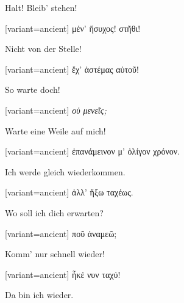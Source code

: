 Halt! Bleib' stehen!

\switchcolumn

\begin{greek}[variant=ancient]%
μέν' ἥσυχος! στῆθι!

\end{greek}%
\switchcolumn*

Nicht von der Stelle!

\switchcolumn

\begin{greek}[variant=ancient]%
ἔχ' ἀστέμας αὐτοῦ!

\end{greek}%
\switchcolumn*

So warte doch!

\switchcolumn

\begin{greek}[variant=ancient]%
\emph{οὐ μενεῖς;}

\end{greek}%
\switchcolumn*

Warte eine Weile auf mich!

\switchcolumn

\begin{greek}[variant=ancient]%
ἐπανάμεινον μ' ὀλίγον χρόνον.

\end{greek}%
\switchcolumn*

Ich werde gleich wiederkommen.

\switchcolumn

\begin{greek}[variant=ancient]%
ἀλλ' ἥξω ταχέως.

\end{greek}%
\switchcolumn*

Wo soll ich dich erwarten?

\switchcolumn

\begin{greek}[variant=ancient]%
ποῦ ἀναμεῶ;

\end{greek}%
\switchcolumn*

Komm' nur schnell wieder!

\switchcolumn

\begin{greek}[variant=ancient]%
ἧκέ νυν ταχύ!

\end{greek}%
\switchcolumn*

Da bin ich wieder.

\switchcolumn

